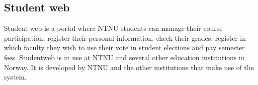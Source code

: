 \subsection{Student web}

Student web is a portal where NTNU students can manage their course participation, register their personal information, check their grades, register in which faculty they wish to use their vote in student elections and pay semester fees.
Studentweb is in use at NTNU and several other education institutions in Norway. It is developed by NTNU and the other institutions that make use of the system.